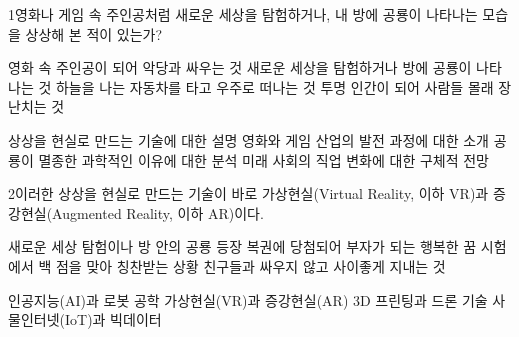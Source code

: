 \documentclass[fs85,seriesRus]{korfarm-base}
\begin{document}
\kfActivityBg \par{}
\par{}\par\nopagebreak[4]\smallskip\nopagebreak[4]
\kfBeginMC
\begin{kfSentenceUnit}{1}{영화나 게임 속 주인공처럼 새로운 세상을 탐험하거나, 내 방에 공룡이 나타나는 모습을 상상해 본 적이 있는가?}
\begin{kfChoices}
\kfChoice 영화 속 주인공이 되어 악당과 싸우는 것
\kfChoice 새로운 세상을 탐험하거나 방에 공룡이 나타나는 것
\kfChoice 하늘을 나는 자동차를 타고 우주로 떠나는 것
\kfChoice 투명 인간이 되어 사람들 몰래 장난치는 것
\end{kfChoices}
\begin{kfChoices}
\kfChoice 상상을 현실로 만드는 기술에 대한 설명
\kfChoice 영화와 게임 산업의 발전 과정에 대한 소개
\kfChoice 공룡이 멸종한 과학적인 이유에 대한 분석
\kfChoice 미래 사회의 직업 변화에 대한 구체적 전망
\end{kfChoices}
\end{kfSentenceUnit}

\begin{kfSentenceUnit}{2}{이러한 상상을 현실로 만드는 기술이 바로 가상현실(Virtual Reality, 이하 VR)과 증강현실(Augmented Reality, 이하 AR)이다.}
\begin{kfChoices}
\kfChoice 새로운 세상 탐험이나 방 안의 공룡 등장
\kfChoice 복권에 당첨되어 부자가 되는 행복한 꿈
\kfChoice 시험에서 백 점을 맞아 칭찬받는 상황
\kfChoice 친구들과 싸우지 않고 사이좋게 지내는 것
\end{kfChoices}
\begin{kfChoices}
\kfChoice 인공지능(AI)과 로봇 공학
\kfChoice 가상현실(VR)과 증강현실(AR)
\kfChoice 3D 프린팅과 드론 기술
\kfChoice 사물인터넷(IoT)과 빅데이터
\end{kfChoices}
\end{kfSentenceUnit}
\end{document}
